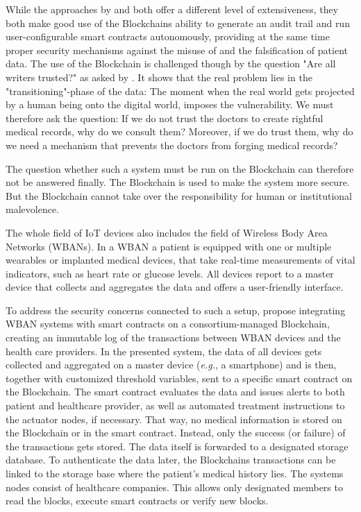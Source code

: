 While the approaches by \cite{Cao2019} and \cite{Azaria2016} both offer a different level of extensiveness, they both make good use of the Blockchains ability to generate an audit trail and run user-configurable smart contracts autonomously, providing at the same time proper security mechanisms against the misuse of and the falsification of patient data.
The use of the Blockchain is challenged though by the question "Are all writers trusted?" as asked by \cite{Wust2017}. It shows that the real problem lies in the "transitioning"-phase of the data: The moment when the real world gets projected by a human being onto the digital world, imposes the vulnerability. We must therefore ask the question: If we do not trust the doctors to create rightful medical records, why do we consult them? Moreover, if we do trust them, why do we need a mechanism that prevents the doctors from forging medical records?

The question whether such a system must be run on the Blockchain can therefore not be answered finally. The Blockchain is used to make the system more secure. But the Blockchain cannot take over the responsibility for human or institutional malevolence.

The whole field of IoT devices also includes the field of Wireless Body Area Networks (WBANs). In a WBAN a patient is equipped with one or multiple wearables or implanted medical devices, that take real-time measurements of vital indicators, such as heart rate or glucose levels. All devices report to a master device that collects and aggregates the data and offers a user-friendly interface.

To address the security concerns connected to such a setup, \cite{Baccarini2018} propose integrating WBAN systems with smart contracts on a consortium-managed Blockchain, creating an immutable log of the transactions between WBAN devices and the health care providers. \cite{Baccarini2018}
In the presented system, the data of all devices gets collected and aggregated on a master device (\textit{e.g.}, a smartphone) and is then, together with customized threshold variables, sent to a specific smart contract on the Blockchain. The smart contract evaluates the data and issues alerts to both patient and healthcare provider, as well as automated treatment instructions to the actuator nodes, if necessary.
That way, no medical information is stored on the Blockchain or in the smart contract. Instead, only the success (or failure) of the transactions gets stored. The data itself is forwarded to a designated storage database.
To authenticate the data later, the Blockchains transactions can be linked to the storage base where the patient's medical history lies.
The systems nodes consist of healthcare companies. This allows only designated members to read the blocks, execute smart contracts or verify new blocks.

